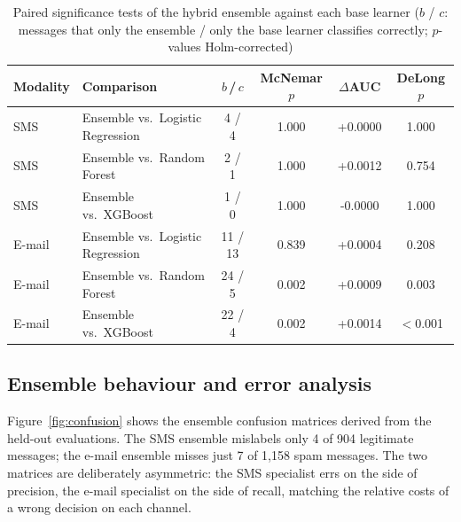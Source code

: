 \documentclass[12pt,a4paper]{report}
\begin{document}
\begin{table}[!htbp]
  \centering
  \caption{Paired significance tests of the hybrid ensemble against each base learner ($b$ / $c$: messages that only the ensemble / only the base learner classifies correctly; $p$-values Holm-corrected)}
  \label{tab:signif}
  \setlength{\tabcolsep}{4pt}
  \begin{tabular}{|L{1.8cm}|L{3.6cm}|c|c|c|c|}
    \hline
    \textbf{Modality} & \textbf{Comparison} & $b$\,/\,$c$ & \textbf{McNemar} $p$ & $\Delta$\textbf{AUC} & \textbf{DeLong} $p$ \\
    \hline
    SMS & Ensemble vs.\ Logistic Regression & 4 / 4 & 1.000 & +0.0000 & 1.000 \\
    \hline
    SMS & Ensemble vs.\ Random Forest & 2 / 1 & 1.000 & +0.0012 & 0.754 \\
    \hline
    SMS & Ensemble vs.\ XGBoost & 1 / 0 & 1.000 & -0.0000 & 1.000 \\
    \hline
    E-mail & Ensemble vs.\ Logistic Regression & 11 / 13 & 0.839 & +0.0004 & 0.208 \\
    \hline
    E-mail & Ensemble vs.\ Random Forest & 24 / 5 & 0.002 & +0.0009 & 0.003 \\
    \hline
    E-mail & Ensemble vs.\ XGBoost & 22 / 4 & 0.002 & +0.0014 & $<$0.001 \\
    \hline
  \end{tabular}
\end{table}

\subsection{Ensemble behaviour and error analysis}

Figure~\ref{fig:confusion} shows the ensemble confusion matrices derived from
the held-out evaluations. The SMS ensemble mislabels only 4 of 904 legitimate
messages; the e-mail ensemble misses just 7 of 1,158 spam messages. The two
matrices are deliberately asymmetric: the SMS specialist errs on the side of
precision, the e-mail specialist on the side of recall, matching the relative
costs of a wrong decision on each channel.
\end{document}

